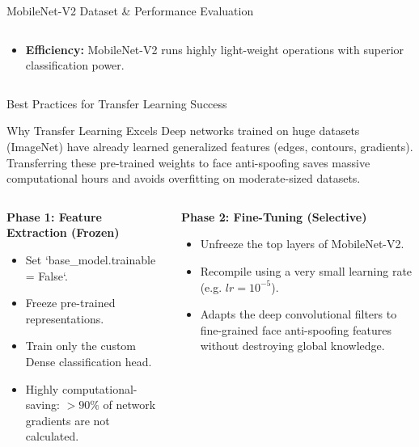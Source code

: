 \documentclass[aspectratio=169, 10pt]{beamer}
\begin{document}
\begin{frame}{MobileNet-V2 Dataset & Performance Evaluation}
\begin{columns}
\begin{column}{0.45\textwidth}
\begin{itemize}
\begin{itemize}
                        \item Final Validation Accuracy: \textbf{94.10\%}
                        \item Landmark performance: Achieves \textbf{almost 94\% (93.80\%)} accuracy on validation by epoch 4.
                    \end{itemize}
                \item \textbf{Efficiency:} MobileNet-V2 runs highly light-weight operations with superior classification power.
            \end{itemize}
        \end{column}
    \end{columns}
\end{frame}

\begin{frame}{Best Practices for Transfer Learning Success}
    \begin{block}{Why Transfer Learning Excels}
        Deep networks trained on huge datasets (ImageNet) have already learned generalized features (edges, contours, gradients). Transferring these pre-trained weights to face anti-spoofing saves massive computational hours and avoids overfitting on moderate-sized datasets.
    \end{block}
    \vspace{0.2cm}
    \begin{columns}
        \begin{column}{0.5\textwidth}
            \textbf{Phase 1: Feature Extraction (Frozen)}
            \begin{itemize}
                \item Set `base\_model.trainable = False`.
                \item Freeze pre-trained representations.
                \item Train only the custom Dense classification head.
                \item Highly computational-saving: $>90\%$ of network gradients are not calculated.
            \end{itemize}
        \end{column}
        \begin{column}{0.5\textwidth}
            \textbf{Phase 2: Fine-Tuning (Selective)}
            \begin{itemize}
                \item Unfreeze the top layers of MobileNet-V2.
                \item Recompile using a very small learning rate (e.g. $lr = 10^{-5}$).
                \item Adapts the deep convolutional filters to fine-grained face anti-spoofing features without destroying global knowledge.
            \end{itemize}
        \end{column}
    \end{columns}
\end{frame}
\end{document}
